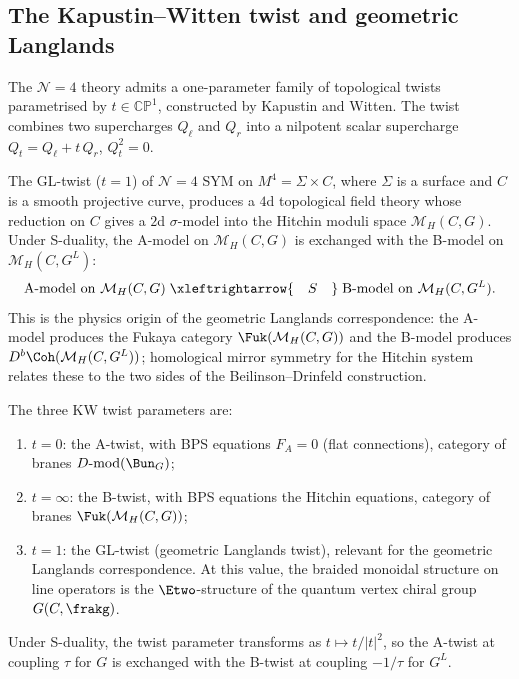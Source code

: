 \subsection{The Kapustin--Witten twist and geometric Langlands}
\label{subsec:phys-kw-twist-langlands}

The $\mathcal{N}=4$ theory admits a one-parameter family of topological twists
parametrised by $t \in \mathbb{CP}^1$, constructed by Kapustin and Witten.
The twist combines two supercharges $Q_\ell$ and $Q_r$ into a nilpotent scalar
supercharge $Q_t = Q_\ell + t\,Q_r$, $Q_t^2 = 0$.

\begin{proposition}
\label{prop:phys-kw-4dtft}
The GL-twist ($t = 1$) of $\mathcal{N}=4$ SYM on $M^4 = \Sigma \times C$,
where $\Sigma$ is a surface and $C$ is a smooth projective curve, produces a
$4$d topological field theory whose reduction on $C$ gives a $2$d $\sigma$-model
into the Hitchin moduli space $\mathcal{M}_H(C, G)$. Under S-duality, the
A-model on $\mathcal{M}_H(C, G)$ is exchanged with the B-model on
$\mathcal{M}_H(C, G^L)$:
\[
 \mathrm{A\text{-}model\ on}\ \mathcal{M}_H(C,G)
 \;\xleftrightarrow{\quad S \quad}\;
 \mathrm{B\text{-}model\ on}\ \mathcal{M}_H(C,G^L).
\]
This is the physics origin of the geometric Langlands correspondence: the A-model
produces the Fukaya category $\Fuk(\mathcal{M}_H(C,G))$ and the B-model produces
$D^b\Coh(\mathcal{M}_H(C,G^L))$; homological mirror symmetry for the Hitchin
system relates these to the two sides of the Beilinson--Drinfeld construction.
\end{proposition}

The three KW twist parameters are:
\begin{enumerate}[label=(\roman*)]
\item $t = 0$: the A-twist, with BPS equations $F_A = 0$ (flat connections),
 category of branes $D\text{-}\mathrm{mod}(\Bun_G)$;
\item $t = \infty$: the B-twist, with BPS equations the Hitchin equations,
 category of branes $\Fuk(\mathcal{M}_H(C,G))$;
\item $t = 1$: the GL-twist (geometric Langlands twist), relevant for the
 geometric Langlands correspondence. At this value, the braided monoidal
 structure on line operators is the $\Etwo$-structure of the quantum vertex
 chiral group $G(C, \frakg)$.
\end{enumerate}

Under S-duality, the twist parameter transforms as $t \mapsto t/|t|^2$, so the
A-twist at coupling $\tau$ for $G$ is exchanged with the B-twist at coupling
$-1/\tau$ for $G^L$.


